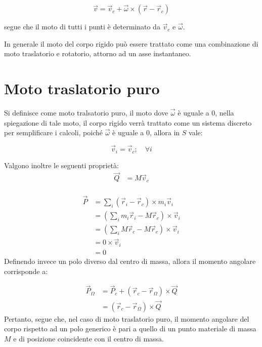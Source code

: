 \documentclass[11pt, a4paper, openright]{book}
\theoremstyle{plain}
\theoremstyle{definition}
\begin{document}
\begin{equation}
    \vec{v} = \vec{v}_c + \vec{\omega} \times (\vec{r} - \vec{r}_c)
\end{equation}

segue che il moto di tutti i punti è determinato da $\vec{v}_c$ e $\vec{\omega}$. 

In generale il moto del corpo rigido può essere trattato come una combinazione di moto traslatorio e rotatorio, attorno ad un asse instantaneo.

\section{Moto traslatorio puro}
Si definisce come moto tralsatorio puro, il moto dove $\vec{\omega}$ è uguale a 0, nella spiegazione di tale moto, il corpo rigido verrà trattato come un sistema discreto per semplificare i calcoli, poiché $\vec{\omega}$ è uguale a 0, allora in $S$ vale:

\begin{equation}
    \vec{v}_i = \vec{v}_c; \quad \forall i
\end{equation}

Valgono inoltre le seguenti proprietà:
\begin{align}
    \vec{Q} & = M\vec{v}_c \\
\end{align}

\begin{align}
    \vec{P} & = \sum_i (\vec{r}_i - \vec{r}_c) \times m_i \vec{v}_i \\
    & = (\sum_i m_i \vec{r}_i - M\vec{r}_c) \times \vec{v}_i \\
    & = (\sum_i M\vec{r}_c - M \vec{r}_c) \times \vec{v}_i \\
    & = 0 \times \vec{v}_i \\
    & = 0
\end{align}
Definendo invece un polo diverso dal centro di massa, allora il momento angolare corrisponde a:

\begin{align}
    \vec{P}_\Omega & = \vec{P}_c + (\vec{r}_c - \vec{r}_\Omega) \times \vec{Q} \\
    & = (\vec{r}_c - \vec{r}_\Omega) \times \vec{Q} 
\end{align}
Pertanto, segue che, nel caso di moto traslatorio puro, il momento angolare del corpo rispetto ad un polo generico è pari a quello di un punto materiale di massa $M$ e di posizione coincidente con il centro di massa.
\end{document}
